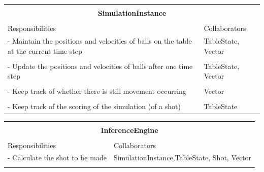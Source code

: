 \documentclass[titlepage]{article}
\begin{document}
\begin{table}[!htbp]
\centering
\begin{tabular}{| p{} | p{} |}\hline
	\multicolumn{2}{|l|}{}\\
	\multicolumn{2}{|c|}{\large{\textbf{SimulationInstance}}}\\
	\multicolumn{2}{|l|}{}\\\hline
	\vspace{0mm}\large{Responsibilities}\vspace{2mm} &\vspace{0mm}\large{Collaborators}\vspace{2mm}\\\hline
	\vspace{0mm}- Maintain the positions and velocities of balls on the table at the current time step	&\vspace{0mm}TableState, Vector\\&\\
	- Update the positions and velocities of balls after one time step									&TableState, Vector\\&\\
	- Keep track of whether there is still movement occurring											&Vector\\&\\
	- Keep track of the scoring of the simulation (of a shot)\vspace{2mm}								&TableState\vspace{2mm}\\\hline
\end{tabular}
\end{table}

\begin{table}[!htbp]
\centering
\begin{tabular}{| p{} | p{} |}\hline
	\multicolumn{2}{|l|}{}\\
	\multicolumn{2}{|c|}{\large{\textbf{InferenceEngine}}}\\
	\multicolumn{2}{|l|}{}\\\hline
	\vspace{0mm}\large{Responsibilities}\vspace{2mm} &\vspace{0mm}\large{Collaborators}\vspace{2mm}\\\hline
	\vspace{0mm}- Calculate the shot to be made		&\vspace{0mm} SimulationInstance,\newline TableState, Shot, Vector\\&\\\hline
\end{tabular}
\end{table}
\end{document}
